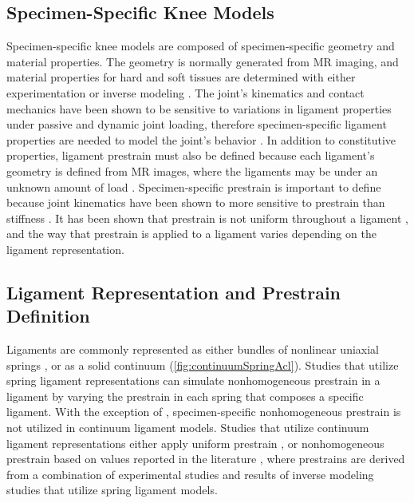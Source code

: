
\subsection*{Specimen-Specific Knee Models}
Specimen-specific knee models are composed of specimen-specific geometry and material properties. The geometry is normally generated from MR imaging, and material properties for hard and soft tissues are determined with either experimentation \citep{gardiner_subject-specific_2003} or inverse modeling \citep{blankevoort_validation_1996,baldwin_efficient_2009,ewing_estimating_2015,harris_combined_2016}. The joint's kinematics and contact mechanics have been shown to be sensitive to variations in ligament properties under passive \citep{baldwin_efficient_2009,dhaher_effect_2010,ewing_estimating_2015} and dynamic \citep{smith_influence_2016-1} joint loading, therefore specimen-specific ligament properties are needed to model the joint's behavior \citep{ewing_estimating_2015}. In addition to constitutive properties, ligament prestrain must also be defined because each ligament's geometry is defined from MR images, where the ligaments may be under an unknown amount of load \citep{weiss_computational_2001,maas_general_2016}. Specimen-specific prestrain is important to define because joint kinematics have been shown to more sensitive to prestrain than stiffness \citep{baldwin_efficient_2009}. It has been shown that prestrain is not uniform throughout a ligament \citep{hull_strain_1996,gardiner_strain_2001} , and the way that prestrain is applied to a ligament varies depending on the ligament representation.

\subsection*{Ligament Representation and Prestrain Definition}
Ligaments are commonly represented as either bundles of nonlinear uniaxial springs \citep{blankevoort_ligament-bone_1991,baldwin_efficient_2009,amiri_computational_2012,kia_multibody_2016}, or as a solid continuum \citep{gardiner_subject-specific_2003,pena_three-dimensional_2006,dhaher_effect_2010} (\autoref{fig:continuumSpringAcl}). Studies that utilize spring ligament representations can simulate nonhomogeneous prestrain in a ligament by varying the prestrain in each spring that composes a specific ligament. With the exception of \cite{gardiner_subject-specific_2003}, specimen-specific nonhomogeneous prestrain is not utilized in continuum ligament models. Studies that utilize continuum ligament representations either apply uniform prestrain \citep{limbert_three-dimensional_2004,song_three-dimensional_2004,beidokhti_influence_2017}, or nonhomogeneous prestrain based on values reported in the literature \citep{pena_three-dimensional_2006,dhaher_effect_2010}, where prestrains are derived from a combination of experimental studies and results of inverse modeling studies that utilize spring ligament models.

